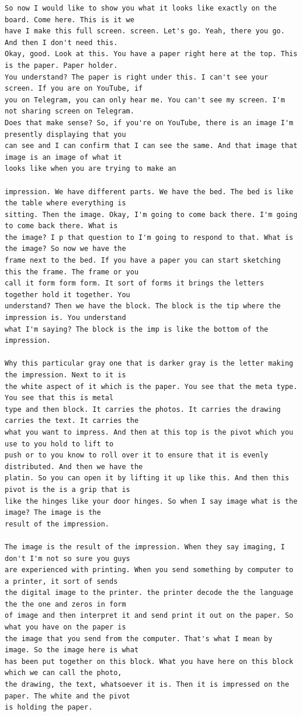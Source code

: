 {\begin{Verbatim}
So now I would like to show you what it looks like exactly on the board. Come here. This is it we
have I make this full screen. screen. Let's go. Yeah, there you go. And then I don't need this.
Okay, good. Look at this. You have a paper right here at the top. This is the paper. Paper holder.
You understand? The paper is right under this. I can't see your screen. If you are on YouTube, if
you on Telegram, you can only hear me. You can't see my screen. I'm not sharing screen on Telegram.
Does that make sense? So, if you're on YouTube, there is an image I'm presently displaying that you
can see and I can confirm that I can see the same. And that image that image is an image of what it
looks like when you are trying to make an

impression. We have different parts. We have the bed. The bed is like the table where everything is
sitting. Then the image. Okay, I'm going to come back there. I'm going to come back there. What is
the image? I p that question to I'm going to respond to that. What is the image? So now we have the
frame next to the bed. If you have a paper you can start sketching this the frame. The frame or you
call it form form form. It sort of forms it brings the letters together hold it together. You
understand? Then we have the block. The block is the tip where the impression is. You understand
what I'm saying? The block is the imp is like the bottom of the impression.

Why this particular gray one that is darker gray is the letter making the impression. Next to it is
the white aspect of it which is the paper. You see that the meta type. You see that this is metal
type and then block. It carries the photos. It carries the drawing carries the text. It carries the
what you want to impress. And then at this top is the pivot which you use to you hold to lift to
push or to you know to roll over it to ensure that it is evenly distributed. And then we have the
platin. So you can open it by lifting it up like this. And then this pivot is the is a grip that is
like the hinges like your door hinges. So when I say image what is the image? The image is the
result of the impression.

The image is the result of the impression. When they say imaging, I don't I'm not so sure you guys
are experienced with printing. When you send something by computer to a printer, it sort of sends
the digital image to the printer. the printer decode the the language the the one and zeros in form
of image and then interpret it and send print it out on the paper. So what you have on the paper is
the image that you send from the computer. That's what I mean by image. So the image here is what
has been put together on this block. What you have here on this block which we can call the photo,
the drawing, the text, whatsoever it is. Then it is impressed on the paper. The white and the pivot
is holding the paper.


\end{Verbatim}}
